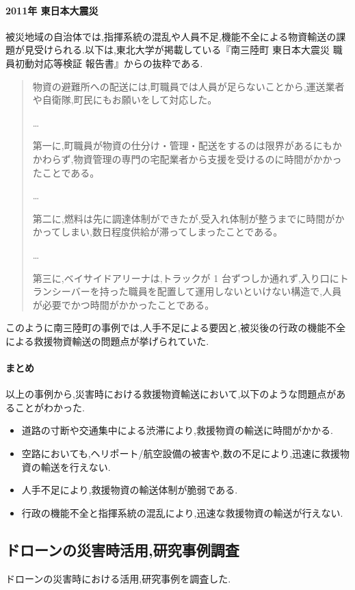 \documentclass{article}[jsarticle]
\begin{document}
\paragraph{2011年 東日本大震災}
被災地域の自治体では,指揮系統の混乱や人員不足,機能不全による物資輸送の課題が見受けられる.以下は,東北大学が掲載している『南三陸町 東日本大震災 職員初動対応等検証 報告書』からの抜粋である.
\begin{quote}
    物資の避難所への配送には,町職員では人員が足らないことから,運送業者や自衛隊,町民にもお願いをして対応した。\par 
    \ldots \par
    第一に,町職員が物資の仕分け・管理・配送をするのは限界があるにもかかわらず,物資管理の専門の宅配業者から支援を受けるのに時間がかかったことである。\par 
    \ldots \par
    第二に,燃料は先に調達体制ができたが,受入れ体制が整うまでに時間がかかってしまい,数日程度供給が滞ってしまったことである。\par
    \ldots \par
    第三に,ベイサイドアリーナは,トラックが 1 台ずつしか通れず,入り口にトランシーバーを持った職員を配置して運用しないといけない構造で,人員が必要でかつ時間がかかったことである。
\end{quote}
このように南三陸町の事例では,人手不足による要因と,被災後の行政の機能不全による救援物資輸送の問題点が挙げられていた.
\paragraph{まとめ}
以上の事例から,災害時における救援物資輸送において,以下のような問題点があることがわかった.
\begin{itemize}
    \item 道路の寸断や交通集中による渋滞により,救援物資の輸送に時間がかかる.
    \item 空路においても,ヘリポート/航空設備の被害や,数の不足により,迅速に救援物資の輸送を行えない.
    \item 人手不足により,救援物資の輸送体制が脆弱である.
    \item 行政の機能不全と指揮系統の混乱により,迅速な救援物資の輸送が行えない.
\end{itemize}

\subsection{ドローンの災害時活用,研究事例調査}
ドローンの災害時における活用,研究事例を調査した.
\end{document}
